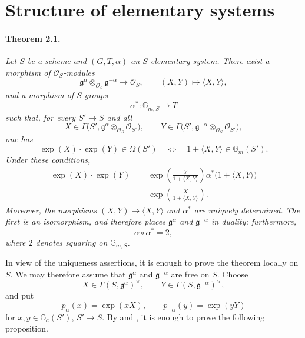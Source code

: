 
\section{Structure of elementary systems}

\paragraph{\textbf{Theorem 2.1.}}
\emph{Let \(S\) be a scheme and \((G,T,\alpha)\) an
\(S\)-elementary system. There exist a morphism of
\(\mathscr O_S\)-modules}
\[
  \mathfrak g^\alpha\otimes_{\mathscr O_S}\mathfrak g^{-\alpha}
    \longrightarrow\mathscr O_S,
  \qquad
  (X,Y)\longmapsto\langle X,Y\rangle,
\]
\emph{and a morphism of \(S\)-groups}
\[
  \alpha^\ast\colon\mathbb G_{m,S}\longrightarrow T
\]
\emph{such that, for every \(S'\to S\) and all}
\[
  X\in\Gamma\bigl(S',
    \mathfrak g^\alpha\otimes_{\mathscr O_S}\mathscr O_{S'}\bigr),
  \qquad
  Y\in\Gamma\bigl(S',
    \mathfrak g^{-\alpha}\otimes_{\mathscr O_S}\mathscr O_{S'}\bigr),
\]
\emph{one has}
\[
  \exp(X)\mathbin{\cdot}\exp(Y)\in\Omega(S')
  \quad\Longleftrightarrow\quad
  1+\langle X,Y\rangle\in\mathbb G_m(S').
\]
\emph{Under these conditions,}
\begin{equation}\tag{F}
\begin{aligned}
  \exp(X)\mathbin{\cdot}\exp(Y)
   ={}&\exp\left(\frac{Y}{1+\langle X,Y\rangle}\right)
       \alpha^\ast\bigl(1+\langle X,Y\rangle\bigr)\\
     &{}\exp\left(\frac{X}{1+\langle X,Y\rangle}\right).
\end{aligned}
\end{equation}
\emph{Moreover, the morphisms
\((X,Y)\mapsto\langle X,Y\rangle\) and \(\alpha^\ast\) are uniquely
determined. The first is an isomorphism, and therefore places
\(\mathfrak g^\alpha\) and \(\mathfrak g^{-\alpha}\) in duality;
furthermore,}
\[
  \alpha\circ\alpha^\ast=2,
\]
\emph{where \(2\) denotes squaring on \(\mathbb G_{m,S}\).}

In view of the uniqueness assertions, it is enough to prove the
theorem locally on \(S\). We may therefore assume that
\(\mathfrak g^\alpha\) and \(\mathfrak g^{-\alpha}\) are free on
\(S\). Choose
\[
  X\in\Gamma(S,\mathfrak g^\alpha)^\times,\qquad
  Y\in\Gamma(S,\mathfrak g^{-\alpha})^\times,
\]
and put
\[
  p_\alpha(x)=\exp(xX),\qquad
  p_{-\alpha}(y)=\exp(yY)
\]
for \(x,y\in\mathbb G_a(S')\), \(S'\to S\). By  and , it
is enough to prove the following proposition.

